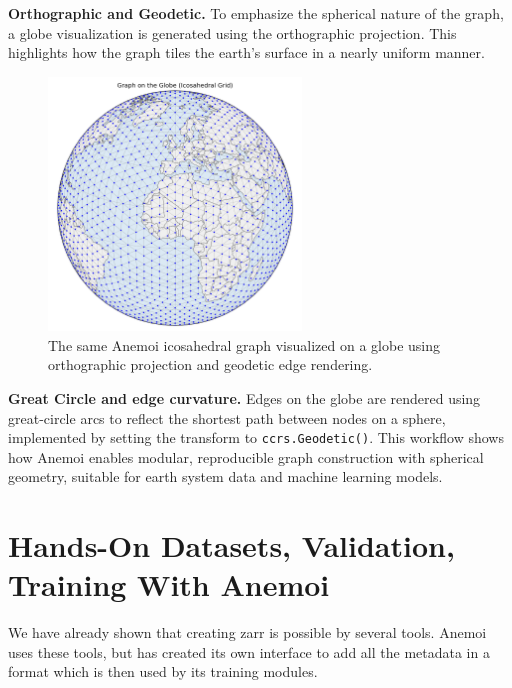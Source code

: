 {\bf Orthographic and Geodetic.}
To emphasize the spherical nature of the graph, a globe visualization is generated using the orthographic projection. This highlights how the graph tiles the earth's surface in a nearly uniform manner.

\begin{figure}[htbp]
    \centering
    \includegraphics[width=0.6\textwidth]{images/anemoi_graph_2.png}
    \caption{The same Anemoi icosahedral graph visualized on a globe using orthographic projection and geodetic edge rendering.}
    \label{fig:anemoi-graph-globe}
\end{figure}

{\bf Great Circle and edge curvature.}
Edges on the globe are rendered using great-circle arcs to reflect the shortest path between nodes on a sphere, implemented by setting the transform to \texttt{ccrs.Geodetic()}. This workflow shows how Anemoi enables modular, reproducible graph construction with spherical geometry, suitable for earth system data and machine learning models.


%
\section{Hands-On Datasets, Validation, Training With Anemoi}

We have already shown that creating zarr is possible by several tools. Anemoi uses these tools, but has created its own interface to add all the metadata in a format which is then used by its training modules. 

